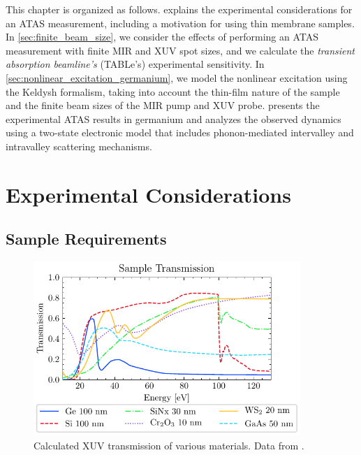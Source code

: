This chapter is organized as follows.  explains the experimental considerations for an ATAS measurement, including a motivation for using thin membrane samples. In \cref{sec:finite_beam_size}, we consider the effects of performing an ATAS measurement with finite MIR and XUV spot sizes, and we calculate the \textit{transient absorption beamline's} (TABLe's) experimental sensitivity. In \cref{sec:nonlinear_excitation_germanium}, we model the nonlinear excitation using the Keldysh formalism, taking into account the thin-film nature of the sample and the finite beam sizes of the MIR pump and XUV probe.  presents the experimental ATAS results in germanium and analyzes the observed dynamics using a two-state electronic model that includes phonon-mediated intervalley and intravalley scattering mechanisms.

\section{Experimental Considerations}
\label{sec:exp_considerations}

\subsection{Sample Requirements}

\begin{figure}
	\centering
	\includegraphics[width=0.9\textwidth]{figures/chap4/Sample_transmission_CXRO.pdf}
	\caption{Calculated XUV transmission of various materials. Data from \cite{gulliksonCXROXRayInteractions}.}
	\label{fig:Sample_trans_CXRO}
\end{figure}

